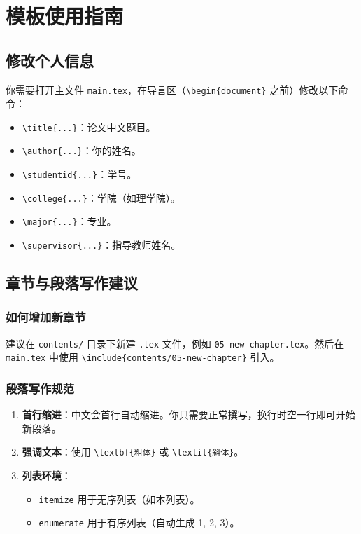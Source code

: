 \chapter{模板使用指南}

\section{修改个人信息}
你需要打开主文件 \texttt{main.tex}，在导言区（\texttt{\textbackslash begin\{document\}} 之前）修改以下命令：
\begin{itemize}
    \item \texttt{\textbackslash title\{...\}}：论文中文题目。
    \item \texttt{\textbackslash author\{...\}}：你的姓名。
    \item \texttt{\textbackslash studentid\{...\}}：学号。
    \item \texttt{\textbackslash college\{...\}}：学院（如理学院）。
    \item \texttt{\textbackslash major\{...\}}：专业。
    \item \texttt{\textbackslash supervisor\{...\}}：指导教师姓名。
\end{itemize}

\section{章节与段落写作建议}

\subsection{如何增加新章节}
建议在 \texttt{contents/} 目录下新建 \texttt{.tex} 文件，例如 \texttt{05-new-chapter.tex}。然后在 \texttt{main.tex} 中使用 \texttt{\textbackslash include\{contents/05-new-chapter\}} 引入。

\subsection{段落写作规范}
\begin{enumerate}
    \item \textbf{首行缩进}：中文会首行自动缩进。你只需要正常撰写，换行时空一行即可开始新段落。
    \item \textbf{强调文本}：使用 \texttt{\textbackslash textbf\{粗体\}} 或 \texttt{\textbackslash textit\{斜体\}}。
    \item \textbf{列表环境}：
        \begin{itemize}
            \item \texttt{itemize} 用于无序列表（如本列表）。
            \item \texttt{enumerate} 用于有序列表（自动生成 1, 2, 3）。
        \end{itemize}
\end{enumerate}

